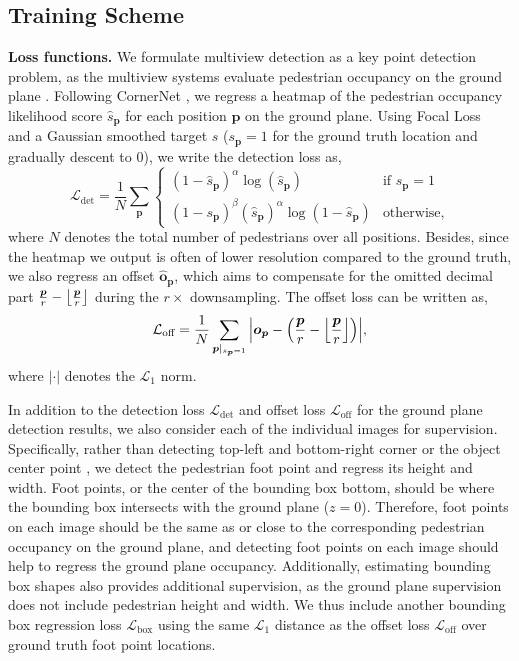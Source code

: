 \documentclass[sigconf,authorversion,nonacm]{acmart}
\DeclarePairedDelimiter\floor{\lfloor}{\rfloor}
\begin{document}
\subsection{Training Scheme}
\label{secsec:train}
\textbf{Loss functions.}
We formulate multiview detection as a key point detection problem, as the multiview systems evaluate pedestrian occupancy on the ground plane \cite{chavdarova2018wildtrack,hou2020multiview}. Following CornerNet \cite{law2018cornernet}, we regress a heatmap of the pedestrian occupancy likelihood score $\hat{s}_{\bm{p}}$ for each position ${\bm{p}}$ on the ground plane. Using Focal Loss~\cite{lin2017focal} and a Gaussian smoothed target $s$ ($s_{\bm{p}}=1$ for the ground truth location and gradually descent to $0$), we write the detection loss as,
\begin{equation}
\label{eq:focal}
    \mathcal{L}_\text{det} = \frac{1}{N}\sum_{\bm{p}}
    \begin{cases}
      (1-\hat{s}_{\bm{p}})^\alpha \log (\hat{s}_{\bm{p}}) & \text{if $s_{\bm{p}}=1$}\\
      (1-s_{\bm{p}})^\beta(\hat{s}_{\bm{p}})^\alpha \log (1-\hat{s}_{\bm{p}}) & \text{otherwise},
    \end{cases}
\end{equation}
where $N$ denotes the total number of pedestrians over all positions. 
Besides, since the heatmap we output is often of lower resolution compared to the ground truth, we also regress an offset $\hat{\bm{o}}_{\bm{p}}$, which aims to compensate for the omitted decimal part $\frac{\bm{p}}{r} - \floor*{\frac{\bm{p}}{r}}$ during the $r\times$ downsampling. The offset loss can be written as,
\begin{equation}
\label{eq:offset}
    \mathcal{L}_\text{off} = \frac{1}{N}\sum_{\bm{p}\rvert_{s_{\bm{p}}=1}}{\left|\bm{o}_{\bm{p}}-\left(\frac{\bm{p}}{r} - \floor*{\frac{\bm{p}}{r}}\right)\right|},
\end{equation}
where $\left|\cdot\right|$ denotes the $\mathcal{L}_1$ norm. 

In addition to the detection loss $\mathcal{L}_\text{det}$ and offset loss $\mathcal{L}_\text{off}$ for the ground plane detection results, we also consider each of the individual images for supervision. 
Specifically, rather than detecting top-left and bottom-right corner \cite{law2018cornernet,duan2019centernet,song2018small} or the object center point \cite{zhou2019objects,duan2019centernet,liu2019high}, we detect the pedestrian foot point and regress its height and width. Foot points, or the center of the bounding box bottom, should be where the bounding box intersects with the ground plane ($z=0$). Therefore, foot points on each image should be the same as or close to the corresponding pedestrian occupancy on the ground plane, and detecting foot points on each image should help to regress the ground plane occupancy. Additionally, estimating bounding box shapes also provides additional supervision, as the ground plane supervision does not include pedestrian height and width. We thus include another bounding box regression loss $\mathcal{L}_\text{box}$ using the same $\mathcal{L}_1$ distance as the offset loss $\mathcal{L}_\text{off}$ over ground truth foot point locations. 
\end{document}
